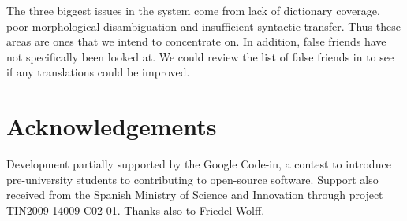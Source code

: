 \documentclass[11pt]{article}
\newcommand{\confname}{EAMT 2011}
\begin{document}
The three biggest issues in the system come from lack of dictionary coverage, poor morphological
disambiguation and insufficient syntactic transfer. Thus these areas are ones that we intend to 
concentrate on. In addition, false friends have not specifically been looked at. We could review
the list of false friends in \cite{Huyssteen:09} to see if any translations could be improved.

\section*{Acknowledgements}
Development partially supported by the Google Code-in,
a contest to introduce pre-university students to contributing to open-source
software. Support also received from the Spanish Ministry of Science and Innovation
through project TIN2009-14009-C02-01. Thanks also to Friedel Wolff.

% 
\end{document}
